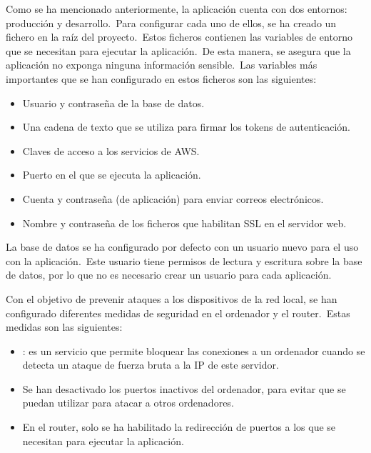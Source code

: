 Como se ha mencionado anteriormente, la aplicación cuenta con dos entornos: producción y desarrollo.\ Para configurar
cada uno de ellos, se ha creado un fichero  en la raíz del proyecto.\ Estos ficheros contienen las
variables de entorno que se necesitan para ejecutar la aplicación.\ De esta manera, se asegura que la aplicación
no exponga ninguna información sensible.\ Las variables más importantes
que se han configurado en estos ficheros son las siguientes:
\begin{itemize}
	\item Usuario y contraseña de la base de datos.
	\item Una cadena de texto que se utiliza para firmar los tokens de autenticación.
	\item Claves de acceso a los servicios de AWS\@.
	\item Puerto en el que se ejecuta la aplicación.
	\item Cuenta y contraseña (de aplicación) para enviar correos electrónicos.
	\item Nombre y contraseña de los ficheros que habilitan SSL en el servidor web.
\end{itemize}
\label{itm:env_variables}

La base de datos se ha configurado por defecto con un usuario nuevo para el uso con la aplicación.\ Este usuario tiene
permisos de lectura y escritura sobre la base de datos, por lo que no es necesario crear un usuario para cada
aplicación.

Con el objetivo de prevenir ataques a los dispositivos de la red local, se han configurado diferentes medidas de
seguridad en el
ordenador y el router.\ Estas medidas son las siguientes:
\begin{itemize}
	\item {}: es un servicio que permite bloquear las conexiones a un ordenador cuando se detecta un
	ataque de fuerza bruta a la IP de este servidor.
	\item Se han desactivado los puertos inactivos del ordenador, para evitar que se puedan utilizar para
	atacar a otros ordenadores.
	\item En el router, solo se ha habilitado la redirección de puertos a los que se necesitan para ejecutar la
	aplicación.
\end{itemize}

